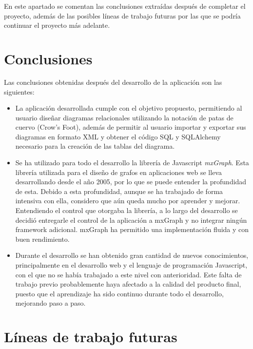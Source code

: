 
En este apartado se comentan las conclusiones extraídas después de completar el proyecto, además de las posibles líneas de trabajo futuras por las que se podría continuar el proyecto más adelante.

\section{Conclusiones}

Las conclusiones obtenidas después del desarrollo de la aplicación son las siguientes:
\begin{itemize}
    \item La aplicación desarrollada cumple con el objetivo propuesto, permitiendo al usuario diseñar diagramas relacionales utilizando la notación de patas de cuervo (Crow's Foot), además de permitir al usuario importar y exportar sus diagramas en formato XML y obtener el código SQL y SQLAlchemy necesario para la creación de las tablas del diagrama.
    \item Se ha utilizado para todo el desarrollo la librería de Javascript \emph{mxGraph}. Esta librería utilizada para el diseño de grafos en aplicaciones web se lleva desarrollando desde el año 2005, por lo que se puede entender la profundidad de esta. Debido a esta profundidad, aunque se ha trabajado de forma intensiva con ella, considero que aún queda mucho por aprender y mejorar. Entendiendo el control que otorgaba la librería, a lo largo del desarrollo se decidió entregarle el control de la aplicación a mxGraph y no integrar ningún framework adicional. mxGraph ha permitido una implementación fluida y con buen rendimiento.
    \item Durante el desarrollo se han obtenido gran cantidad de nuevos conocimientos, principalmente en el desarrollo web y el lenguaje de programación Javascript, con el que no se había trabajado a este nivel con anterioridad. Este falta de trabajo previo probablemente haya afectado a la calidad del producto final, puesto que el aprendizaje ha sido continuo durante todo el desarrollo, mejorando paso a paso.
\end{itemize}

\section{Líneas de trabajo futuras}


